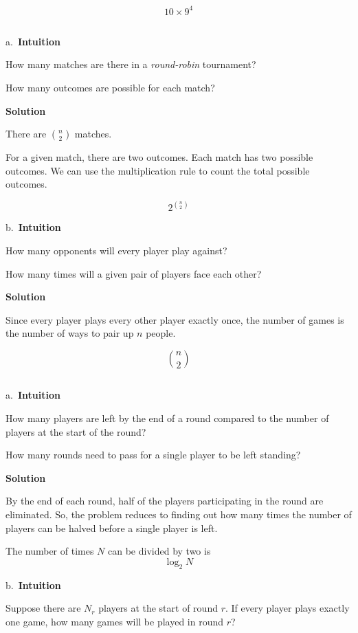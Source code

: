 \documentclass[]{book}
\begin{document}
\[ 10 \times 9^{4} \]

\subsection{}\label{section-3}

a.~\textbf{Intuition}

How many matches are there in a \emph{round-robin} tournament?

How many outcomes are possible for each match?

 \textbf{Solution}

There are \({n \choose 2}\) matches.

For a given match, there are two outcomes. Each match has two possible
outcomes. We can use the multiplication rule to count the total possible
outcomes.

\[ 2^{{n \choose 2}} \]

b.~\textbf{Intuition}

How many opponents will every player play against?

How many times will a given pair of players face each other?

 \textbf{Solution}

Since every player plays every other player exactly once, the number of
games is the number of ways to pair up \(n\) people.

\[ {n \choose 2} \]

\subsection{}\label{section-4}

a.~\textbf{Intuition}

How many players are left by the end of a round compared to the number
of players at the start of the round?

How many rounds need to pass for a single player to be left standing?

 \textbf{Solution}

By the end of each round, half of the players participating in the round
are eliminated. So, the problem reduces to finding out how many times
the number of players can be halved before a single player is left.

The number of times \(N\) can be divided by two is \[\log_{2}{N}\]

b.~\textbf{Intuition}

Suppose there are \(N_{r}\) players at the start of round \(r\). If
every player plays exactly one game, how many games will be played in
round \(r\)?
\end{document}
